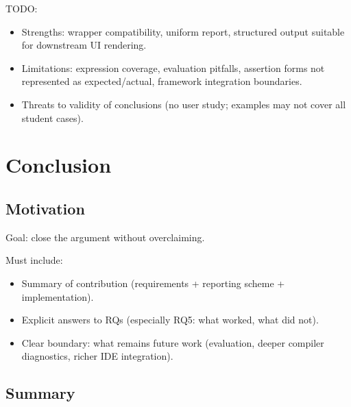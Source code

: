 \documentclass[
	bibliography=totoc,
	listof=totoc,
]{scrbook}
\begin{document}
\begin{marker}\begin{justify}
TODO:
\begin{itemize}
    \item Strengths: wrapper compatibility, uniform report, structured output suitable for downstream UI rendering.
    \item Limitations: expression coverage, evaluation pitfalls, assertion forms not represented as expected/actual, framework integration boundaries.
    \item Threats to validity of conclusions (no user study; examples may not cover all student cases).
\end{itemize}
\end{justify}\end{marker}


\pagebreak %
\chapter{Conclusion} %
\section*{Motivation} %

\begin{justify}
Goal: close the argument without overclaiming.

Must include:
\begin{itemize}
    \item Summary of contribution (requirements + reporting scheme + implementation).
    \item Explicit answers to RQs (especially RQ5: what worked, what did not).
    \item Clear boundary: what remains future work (evaluation, deeper compiler diagnostics, richer IDE integration).
\end{itemize}
\end{justify}


\section{Summary} %
\end{document}
